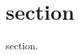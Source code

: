 \documentclass{book}
\renewcommand{\_}{\Texinfounderscore\discretionary{}{}{}}
\begin{document}
\label{anchor:Top}%
\label{anchor:Chapter}%
\section{{section}}
\label{anchor:section-node}%

section.

\tableofcontents\newpage
\end{document}
